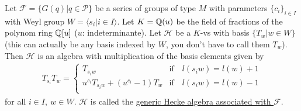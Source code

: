 \documentclass[]{article}
\begin{document}
\begin{proposition}
    Let \(\mathscr{F}=\{G(q) | q \in \mathscr{P}\}\) be a series of groups of type \(M\) with parameters \(\{c_i\}_{i \in I}\) with 
    Weyl group \(W= \langle s_i | i \in I \rangle\). Let \(K = {\mathbb{Q}}(u)\) be the field of fractions of the polynom ring \({\mathbb{Q}}[u]\) (\(u\): indeterminante).
    Let \(\mathscr{H}\) be a \(K\)-vs with basis \(\{T_w | w \in W\}\) (this can actually be any basis indexed by \(W\), you don't have to call them \(T_w\)). Then \(\mathscr{H}\) is an algebra with multiplication of the basis elements 
    given by
    \begin{align}
        T_{s_i} T_w =
        \begin{cases}
            T_{s_i w}& \text{if} \quad l(s_i w) = l(w) +1 \\
            u^{c_i}T_{s_i w}+(u^{c_i}-1)T_w & \text{if} \quad l(s_i w)= l(w)-1 \\
        \end{cases}
        \label{generatingDef}
    \end{align}
    for all \(i \in I, \ w \in W\). \(\mathscr{H}\) is called the \underline{generic Hecke algebra associated with \(\mathscr{F}\)}.
\end{proposition}
\end{document}
